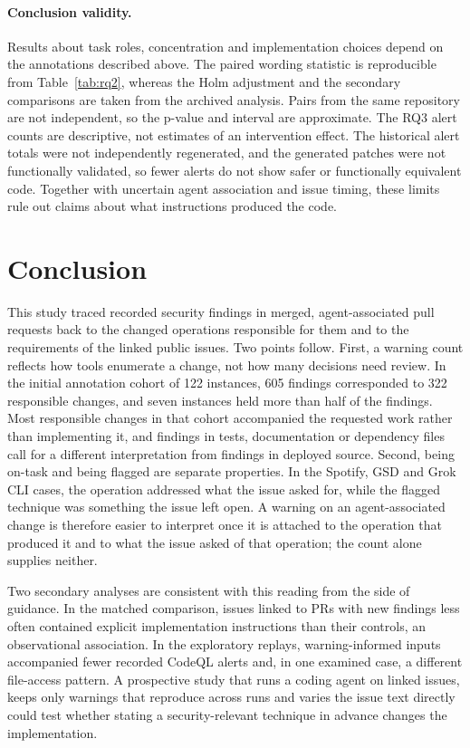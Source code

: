 \documentclass[acmsmall,screen,nonacm,review]{acmart}
\begin{document}
\paragraph{Conclusion validity.} Results about task roles, concentration and implementation choices depend on the annotations described above. The paired wording statistic is reproducible from Table~\ref{tab:rq2}, whereas the Holm adjustment and the secondary comparisons are taken from the archived analysis. Pairs from the same repository are not independent, so the p-value and interval are approximate. The RQ3 alert counts are descriptive, not estimates of an intervention effect. The historical alert totals were not independently regenerated, and the generated patches were not functionally validated, so fewer alerts do not show safer or functionally equivalent code. Together with uncertain agent association and issue timing, these limits rule out claims about what instructions produced the code.

\section{Conclusion}\label{sec:conclusion}
\enlargethispage{2\baselineskip}

This study traced recorded security findings in merged, agent-associated pull requests back to the changed operations responsible for them and to the requirements of the linked public issues. Two points follow. First, a warning count reflects how tools enumerate a change, not how many decisions need review. In the initial annotation cohort of 122 instances, 605 findings corresponded to 322 responsible changes, and seven instances held more than half of the findings. Most responsible changes in that cohort accompanied the requested work rather than implementing it, and findings in tests, documentation or dependency files call for a different interpretation from findings in deployed source. Second, being on-task and being flagged are separate properties. In the Spotify, GSD and Grok CLI cases, the operation addressed what the issue asked for, while the flagged technique was something the issue left open. A warning on an agent-associated change is therefore easier to interpret once it is attached to the operation that produced it and to what the issue asked of that operation; the count alone supplies neither.

Two secondary analyses are consistent with this reading from the side of guidance. In the matched comparison, issues linked to PRs with new findings less often contained explicit implementation instructions than their controls, an observational association. In the exploratory replays, warning-informed inputs accompanied fewer recorded CodeQL alerts and, in one examined case, a different file-access pattern. A prospective study that runs a coding agent on linked issues, keeps only warnings that reproduce across runs and varies the issue text directly could test whether stating a security-relevant technique in advance changes the implementation.
\end{document}
